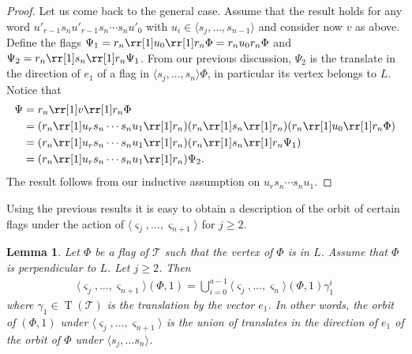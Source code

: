 \documentclass[final]{amsart}
\theoremstyle{plain}
\newtheorem{lem}[thm]{Lemma}
\theoremstyle{definition}
\theoremstyle{remark}
\numberwithin{equation}{section}
\renewcommand{\{}{\lbrace}
\renewcommand{\}}{\rbrace}
\newcommand{\cT}{\mathcal{T}}
\DeclareMathOperator{\tras}{T}
\newcommand{\es}{\varsigma}
\begin{document}
\begin{proof}
  Let us come back to the general case. Assume that the result holds for any word  $u'_{r-1}s_{n} u'_{r-1} s_{n} \cdots s_{n} u'_{0}$ with $u_{i} \in \langle s_{j}, \dots, s_{n-1} \rangle$ and consider now $v$ as above.
  Define the flags $\Psi_1 = r_{n} \rr[1] u_{0} \rr[1] r_{n} \Phi = r_n u_0 r_n \Phi$ and  $\Psi_2 = r_{n} \rr[1] s_{n} \rr[1] r_{n} \Psi_1$. 
  From our previous discussion, $\Psi_2$ is the translate in the direction of $e_1$ of a flag in $\langle s_{j}, \dots, s_{n} \rangle \Phi$, in particular its vertex belongs to $L$.
  Notice that 
  \begin{align*}
    \Psi &= r_{n} \rr[1] v \rr[1] r_{n} \Phi \\
    &= (r_{n} \rr[1] u_{r} s_n \cdots s_n u_1 \rr[1] r_n)(r_{n} \rr[1] s_{n} \rr[1] r_{n})  (r_{n} \rr[1] u_{0} \rr[1] r_{n} \Phi) \\
    &= (r_{n} \rr[1] u_{r} s_n \cdots s_n u_1 \rr[1] r_n)(r_{n} \rr[1] s_{n} \rr[1] r_{n} \Psi_1) \\
    &= (r_{n} \rr[1] u_{r} s_n \cdots s_n u_1 \rr[1] r_n) \Psi_2. \\
  \end{align*} 
The result follows from our inductive assumption on $u_r s_n \cdots s_n u_1$.
\end{proof}
















Using the previous results it is easy to obtain a description of the orbit of certain flags under the action of $\langle \es_{j}, \dots, \es_{n+1} \rangle$ for $j \geq 2$.


\begin{lem}\label{lem:IP_orbitGreatGens} 
  Let $\Phi$ be a flag of $\cT$ such that the vertex of $\Phi$ is in $L$. Assume that $\Phi$ is perpendicular to $L$. Let $j \geq 2$. Then
  \begin{equation}\label{eq:IP_orbitGreatGens}
	  \begin{split}
		  \langle \es_{j}, \dots, \es_{n+1}\rangle(\Phi,1) =\bigcup_{i=0}^{a-1} \langle \es_{j}, \dots, \es_{n}\rangle (\Phi,1)\gamma_{1}^{i}
	  \end{split}
  \end{equation}where $\gamma_{1} \in \tras(\cT)$ is the translation by the vector $e_{1}$. 
  In other words, the orbit of $(\Phi,1)$ under $\langle \es_{j}, \dots, \es_{n+1}\rangle$ is the union of translates in the direction of $e_1$  of the orbit of $\Phi$ under $\langle s_{j}, \dots s_{n}\rangle$. 
\end{lem}
\end{document}
